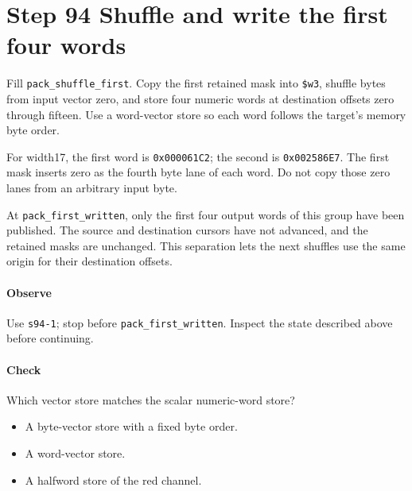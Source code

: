 \section{Step 94 Shuffle and write the first four words}
Fill \texttt{pack\_shuffle\_first}. Copy the first retained mask into \texttt{\$w3}, shuffle bytes from input vector zero, and store four numeric words at destination offsets zero through fifteen. Use a word-vector store so each word follows the target’s memory byte order.

For width17, the first word is \texttt{0x000061C2}; the second is \texttt{0x002586E7}. The first mask inserts zero as the fourth byte lane of each word. Do not copy those zero lanes from an arbitrary input byte.

At \texttt{pack\_first\_written}, only the first four output words of this group have been published. The source and destination cursors have not advanced, and the retained masks are unchanged. This separation lets the next shuffles use the same origin for their destination offsets.

\paragraph{Observe} Use \texttt{s94-1}; stop before \texttt{pack\_first\_written}. Inspect the state described above before continuing.

\paragraph{Check} Which vector store matches the scalar numeric-word store?
\begin{itemize}
  \item[A.] A byte-vector store with a fixed byte order.
  \item[B.] A word-vector store.
  \item[C.] A halfword store of the red channel.
\end{itemize}

